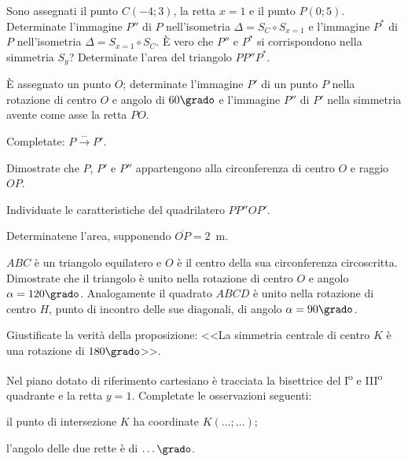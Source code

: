 \begin{esercizio}
\label{ese:8.65} %
Sono assegnati il punto $C(-4;3)$, la retta $x=1$ e il punto 
$P(0;5)$. Determinate l'immagine $P''$ di $P$ nell'isometria 
$\Delta=S_{C}\circ S_{x=1}$ e l'immagine $P^*$ di $P$ nell'isometria 
$\Delta=S_{x=1}\circ S_{C}$. \`E vero che $P''$ e $P^*$ si 
corrispondono nella simmetria $S_y$? Determinate l'area del triangolo 
$PP''P^*$.
\end{esercizio}

\begin{esercizio}
\label{ese:8.66} %
\`E assegnato un punto $O$; determinate l'immagine $P'$ di un punto 
$P$ nella rotazione di centro $O$ e angolo di $60\grado$ e l'immagine 
$P''$ di $P'$ nella simmetria avente come asse la retta $PO$.
\begin{enumeratea}
\item Completate: $P \overset{\ldots{}}\longrightarrow P'$. 
\item Dimostrate che $P$, $P'$ e $P''$ appartengono alla 
circonferenza di centro $O$ e raggio $OP$.
\item Individuate le caratteristiche del quadrilatero $PP''OP'$.
\item Determinatene l'area, supponendo $\overline{OP}=2$~m.
\end{enumeratea}
\end{esercizio}

\begin{esercizio}
\label{ese:8.67} %
$ABC$ è un triangolo equilatero e $O$ è il centro della sua 
circonferenza circoscritta. Dimostrate che il triangolo è unito nella 
rotazione di centro $O$ e angolo $\alpha=120\grado$. Analogamente il 
quadrato $ABCD$ è unito nella rotazione di centro $H$, punto di 
incontro delle sue diagonali, di angolo $\alpha=90\grado$.
\end{esercizio}

\begin{esercizio}
\label{ese:8.68} %
Giustificate la verità della proposizione: <<La simmetria centrale di 
centro $K$ è una rotazione di $180\grado$>>.
\end{esercizio}

\begin{esercizio}
\label{ese:8.69} %
Nel piano dotato di riferimento cartesiano è tracciata la bisettrice 
del I\textsuperscript{o} e III\textsuperscript{o} quadrante e la 
retta $y=1$. Completate le osservazioni seguenti:
\begin{enumeratea}
\item il punto di intersezione $K$ ha coordinate 
$K(\ldots{};\ldots{})$;
\item l'angolo delle due rette è di $\ldots{}\grado$.
\end{enumeratea}
\end{esercizio}

